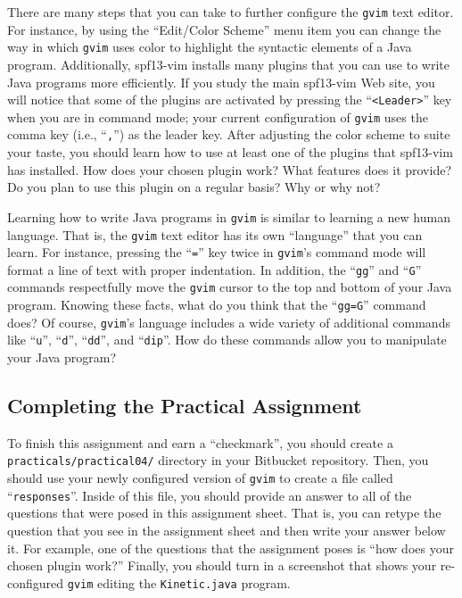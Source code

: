 There are many steps that you can take to further configure the {\tt gvim} text editor.  For instance, by using the
``Edit/Color Scheme'' menu item you can change the way in which {\tt gvim} uses color to highlight the syntactic
elements of a Java program. Additionally, spf13-vim installs many plugins that you can use to write Java programs more
efficiently.  If you study the main spf13-vim Web site, you will notice that some of the plugins are activated by
pressing the ``{\tt <Leader>}'' key when you are in command mode; your current configuration of {\tt gvim} uses the
comma key (i.e., ``{\tt ,}'') as the leader key. After adjusting the color scheme to suite your taste, you should learn
how to use at least one of the plugins that spf13-vim has installed.  How does your chosen plugin work?  What features
does it provide? Do you plan to use this plugin on a regular basis? Why or why not? 

Learning how to write Java programs in {\tt gvim} is similar to learning a new human language.  That is, the {\tt gvim}
text editor has its own ``language'' that you can learn.  For instance, pressing the ``{\tt =}'' key twice in {\tt gvim}'s
command mode will format a line of text with proper indentation.  In addition, the ``{\tt gg}'' and ``{\tt G}'' commands
respectfully move the {\tt gvim} cursor to the top and bottom of your Java program.  Knowing these facts, what do you
think that the ``{\tt gg=G}'' command does? Of course, {\tt gvim}'s language includes a wide variety of additional
commands like ``{\tt u}'', ``{\tt d}'', ``{\tt dd}'', and ``{\tt dip}''.  How do these commands allow you to manipulate
your Java program?

\vspace*{-.15in}
\subsection*{Completing the Practical Assignment}
\vspace*{-.1in}

To finish this assignment and earn a ``checkmark'', you should create a {\tt practicals/practical04/}
directory in your Bitbucket repository. Then, you should use your newly configured version of {\tt gvim} to create a
file called ``{\tt responses}''. Inside of this file, you should provide an answer to all of the questions that were
posed in this assignment sheet. That is, you can retype the question that you see in the assignment sheet and then write
your answer below it. For example, one of the questions that the assignment poses is ``how does your chosen plugin
work?'' Finally, you should turn in a screenshot that shows your re-configured {\tt gvim} editing the {\tt Kinetic.java}
program.


